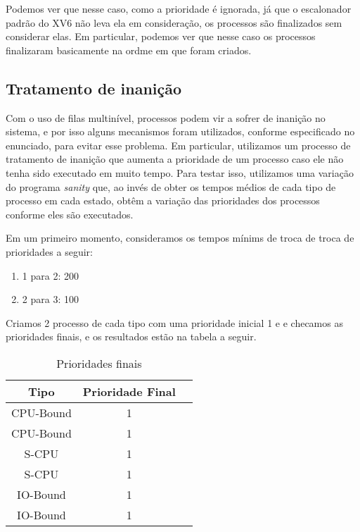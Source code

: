 \documentclass{article}
\begin{document}
Podemos ver que nesse caso, como a prioridade é ignorada, já que o escalonador
padrão do XV6 não leva ela em consideração, os processos são finalizados sem
considerar elas. Em particular, podemos ver que nesse caso os processos
finalizaram basicamente na ordme em que foram criados.

\subsection{Tratamento de inanição}

Com o uso de filas multinível, processos podem vir a sofrer de inanição no
sistema, e por isso alguns mecanismos foram utilizados, conforme especificado
no enunciado, para evitar esse problema. Em particular, utilizamos um processo
de tratamento de inanição que aumenta a prioridade de um processo caso ele não
tenha
sido executado em muito tempo. Para testar isso, utilizamos uma variação do
programa \textit{sanity} que, ao invés de obter os tempos médios de cada tipo
de processo em cada estado, obtêm a variação das prioridades dos processos
conforme eles são executados.

Em um primeiro momento, consideramos os tempos mínims de troca de troca de
prioridades a seguir:

\begin{enumerate}
      \item 1 para 2: 200
      \item 2 para 3: 100
\end{enumerate}

Criamos 2 processo de cada tipo com uma prioridade inicial 1 e e checamos as
prioridades finais, e os resultados estão na tabela a seguir.

\begin{table}[H]
      \centering
      \begin{tabular}{|c|c|c|}
            \hline
            \textbf{Tipo} & \textbf{Prioridade Final} \\
            \hline
            CPU-Bound     & 1                         \\
            CPU-Bound     & 1                         \\
            S-CPU         & 1                         \\
            S-CPU         & 1                         \\
            IO-Bound      & 1                         \\
            IO-Bound      & 1                         \\
            \hline
      \end{tabular}
      \caption{Prioridades finais}
\end{table}
\end{document}
